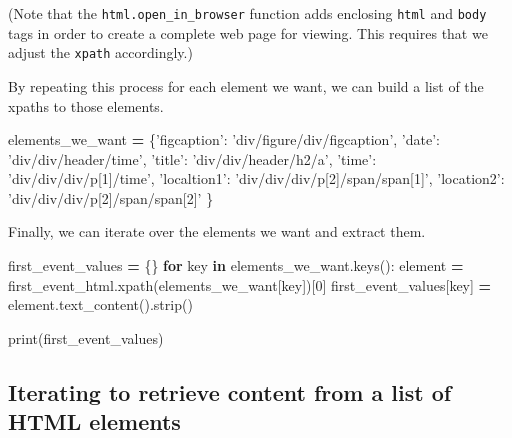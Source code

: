 \documentclass[]{book}
\newenvironment{Shaded}{\begin{snugshade}}{\end{snugshade}}
\newcommand{\BuiltInTok}[1]{#1}
\newcommand{\ControlFlowTok}[1]{\textcolor[rgb]{0.13,0.29,0.53}{\textbf{#1}}}
\newcommand{\DecValTok}[1]{\textcolor[rgb]{0.00,0.00,0.81}{#1}}
\newcommand{\KeywordTok}[1]{\textcolor[rgb]{0.13,0.29,0.53}{\textbf{#1}}}
\newcommand{\NormalTok}[1]{#1}
\newcommand{\OperatorTok}[1]{\textcolor[rgb]{0.81,0.36,0.00}{\textbf{#1}}}
\newcommand{\StringTok}[1]{\textcolor[rgb]{0.31,0.60,0.02}{#1}}
\begin{document}
(Note that the \texttt{html.open\_in\_browser} function adds enclosing \texttt{html}
and \texttt{body} tags in order to create a complete web page for viewing.
This requires that we adjust the \texttt{xpath} accordingly.)

By repeating this process for each element we want, we can build a
list of the xpaths to those elements.

\begin{Shaded}
\begin{Highlighting}[]
\NormalTok{elements_we_want }\OperatorTok{=}\NormalTok{ \{}\StringTok{'figcaption'}\NormalTok{: }\StringTok{'div/figure/div/figcaption'}\NormalTok{,}
                    \StringTok{'date'}\NormalTok{: }\StringTok{'div/div/header/time'}\NormalTok{,}
                    \StringTok{'title'}\NormalTok{: }\StringTok{'div/div/header/h2/a'}\NormalTok{,}
                    \StringTok{'time'}\NormalTok{: }\StringTok{'div/div/div/p[1]/time'}\NormalTok{,}
                    \StringTok{'localtion1'}\NormalTok{: }\StringTok{'div/div/div/p[2]/span/span[1]'}\NormalTok{,}
                    \StringTok{'location2'}\NormalTok{: }\StringTok{'div/div/div/p[2]/span/span[2]'}
\NormalTok{                    \}}
\end{Highlighting}
\end{Shaded}

Finally, we can iterate over the elements we want and extract them.

\begin{Shaded}
\begin{Highlighting}[]
\NormalTok{first_event_values }\OperatorTok{=}\NormalTok{ \{\}}
\ControlFlowTok{for}\NormalTok{ key }\KeywordTok{in}\NormalTok{ elements_we_want.keys():}
\NormalTok{    element }\OperatorTok{=}\NormalTok{ first_event_html.xpath(elements_we_want[key])[}\DecValTok{0}\NormalTok{]}
\NormalTok{    first_event_values[key] }\OperatorTok{=}\NormalTok{ element.text_content().strip()}

\BuiltInTok{print}\NormalTok{(first_event_values)}
\end{Highlighting}
\end{Shaded}

\hypertarget{iterating-to-retrieve-content-from-a-list-of-html-elements}{%
\subsection{Iterating to retrieve content from a list of HTML elements}\label{iterating-to-retrieve-content-from-a-list-of-html-elements}}
\end{document}
